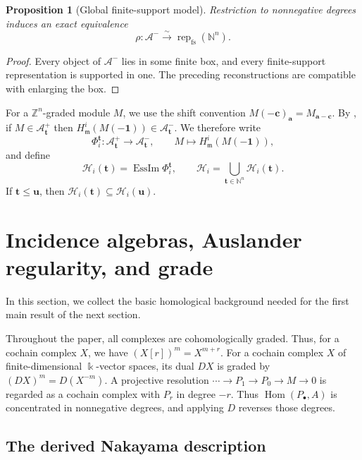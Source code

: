 \documentclass[12pt,reqno]{amsart}
\newtheorem{proposition}[theorem]{Proposition}
\theoremstyle{definition}
\theoremstyle{remark}
\newcommand{\Rep}{\operatorname{rep}}
\newcommand{\Hom}{\operatorname{Hom}}
\newcommand{\EssIm}{\operatorname{EssIm}}
\begin{document}
\begin{proposition}[Global finite-support model]\label{prop:global-fs}
Restriction to nonnegative degrees induces an exact equivalence
\[
\rho:\mathcal A^-\xrightarrow{\sim}\Rep_{\mathrm{fs}}(\mathbb N^n).
\]
\end{proposition}

\begin{proof}
Every object of $\mathcal A^-$ lies in some finite box, and every finite-support
representation is supported in one.  The preceding reconstructions are
compatible with enlarging the box.
\end{proof}

For a $\mathbb{Z}^n$-graded module $M$, we use the shift convention
$M(-\mathbf c)_{\mathbf a}=M_{\mathbf a-\mathbf c}$. By \cite[Proposition~2.8 and Remark~2.9]{BF}, if
$M\in\mathcal A^+_{\mathbf t}$ then
$H^i_{\mathfrak m}(M(-\mathbf1))\in\mathcal A^-_{\mathbf t}$.  We therefore
write
\[
\Phi_i^{\mathbf t}:\mathcal A^+_{\mathbf t}\longrightarrow
\mathcal A^-_{\mathbf t},\qquad
M\longmapsto H^i_{\mathfrak m}(M(-\mathbf1)),
\]
and define
\[
\mathcal H_i(\mathbf t)=\EssIm\Phi_i^{\mathbf t},
\qquad
\mathcal H_i=\bigcup_{\mathbf t\in\mathbb N^n}\mathcal H_i(\mathbf t).
\]
If $\mathbf t\le\mathbf u$, then
$\mathcal H_i(\mathbf t)\subseteq\mathcal H_i(\mathbf u)$.

\section{Incidence algebras, Auslander regularity, and grade}\label{sec:homological}
In this section, we collect the basic homological background needed for the first main result of the next section.

Throughout the paper, all complexes are cohomologically graded.  Thus, for a cochain complex $X$, we have $(X[r])^m=X^{m+r}$.  For a cochain complex $X$ of finite-dimensional $\Bbbk$-vector spaces, its dual $DX$ is graded by $(DX)^m=D(X^{-m})$.  A projective resolution $\cdots\to P_1\to P_0\to M\to0$ is regarded as a cochain complex with $P_r$ in degree $-r$.  Thus $\Hom(P_\bullet,A)$ is concentrated in nonnegative degrees, and applying $D$ reverses those degrees.

\subsection{The derived Nakayama description}
\end{document}
